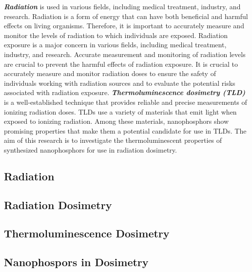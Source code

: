 \documentclass[../../Report.tex]{subfiles}
\begin{document}
    \textit{\textbf{Radiation}} is used in various fields, including medical treatment, industry, and research. 
    Radiation is a form of energy that can have both beneficial and harmful effects on living organisms.
    Therefore, it is important to accurately measure and monitor the levels of radiation to which individuals are exposed.
    Radiation exposure is a major concern in various fields, including medical treatment, industry, and research. Accurate 
    measurement and monitoring of radiation levels are crucial to prevent the harmful effects of radiation exposure.
    It is crucial to accurately measure and monitor radiation doses to ensure the safety of 
    individuals working with radiation sources and to evaluate the potential risks associated with radiation exposure. 
    \textit{\textbf{Thermoluminescence dosimetry (TLD)}} is a well-established technique that provides reliable and precise measurements 
    of ionizing radiation doses. TLDs use a variety of materials that emit light when exposed to ionizing radiation. 
    Among these materials, nanophosphors show promising properties that make them a potential candidate for use in TLDs. 
    The aim of this research is to investigate the thermoluminescent properties of synthesized nanophosphors for use in radiation dosimetry. 

    \subsection{\large Radiation}
        

    \newpage
    \subsection{\large Radiation Dosimetry}
        
    \newpage
    \subsection{\large Thermoluminescence Dosimetry}
        
        
    \newpage
    \subsection{\large Nanophospors in Dosimetry}
        
\end{document}
